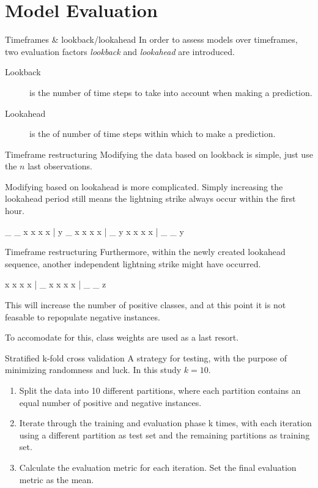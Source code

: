 \documentclass[10pt]{beamer}
\begin{document}
\section{Model Evaluation}


\begin{frame}{Timeframes \& lookback/lookahead}
In order to assess models over timeframes, two evaluation factors \textit{lookback} and \textit{lookahead} are introduced.
\begin{description}
	\item[Lookback] is the number of time steps to take into account when making a prediction.
	\item[Lookahead] is the of number of time steps within which to make a prediction.
\end{description}
\end{frame}


\begin{frame}[fragile]{Timeframe restructuring}
Modifying the data based on lookback is simple, just use the $n$ last observations.
\par
Modifying based on lookahead is more complicated. Simply increasing the lookahead period still means the lightning strike always occur within the first hour.
\begin{semiverbatim}
	_ _ x x x x | y
	_ x x x x | _ y
	x x x x | _ _ y
\end{semiverbatim}
\end{frame}


\begin{frame}[fragile]{Timeframe restructuring}
Furthermore, within the newly created lookahead sequence, another independent lightning strike might have occurred.
\begin{semiverbatim}
	x x x x | _
	x x x x | _ _ z
\end{semiverbatim}
\par
This will increase the number of positive classes, and at this point it is not feasable to repopulate negative instances.
\par
To accomodate for this, class weights are used as a last resort.
\end{frame}


\begin{frame}{Stratified k-fold cross validation}
A strategy for testing, with the purpose of minimizing randomness and luck. In this study $k=10$.
\begin{enumerate}
	\item Split the data into 10 different partitions, where each partition contains an equal number of positive and negative instances.
	\item Iterate through the training and evaluation phase k times, with each iteration using a different partition as test set and the remaining partitions as training set.
	\item Calculate the evaluation metric for each iteration. Set the final evaluation metric as the mean.
\end{enumerate}
\end{frame}
\end{document}

